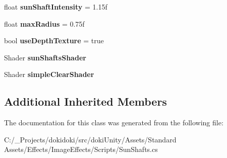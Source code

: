 \begin{DoxyCompactItemize}
\item 
float {\bfseries sun\+Shaft\+Intensity} = 1.\+15f\hypertarget{class_unity_standard_assets_1_1_image_effects_1_1_sun_shafts_a7a45b2ff55145c73dbe893aeabff41ad}{}\label{class_unity_standard_assets_1_1_image_effects_1_1_sun_shafts_a7a45b2ff55145c73dbe893aeabff41ad}

\item 
float {\bfseries max\+Radius} = 0.\+75f\hypertarget{class_unity_standard_assets_1_1_image_effects_1_1_sun_shafts_a2cccffc6bddcdc2fd32fbb6145bd408d}{}\label{class_unity_standard_assets_1_1_image_effects_1_1_sun_shafts_a2cccffc6bddcdc2fd32fbb6145bd408d}

\item 
bool {\bfseries use\+Depth\+Texture} = true\hypertarget{class_unity_standard_assets_1_1_image_effects_1_1_sun_shafts_ae9f2012110c36d04ac603df5317feb17}{}\label{class_unity_standard_assets_1_1_image_effects_1_1_sun_shafts_ae9f2012110c36d04ac603df5317feb17}

\item 
Shader {\bfseries sun\+Shafts\+Shader}\hypertarget{class_unity_standard_assets_1_1_image_effects_1_1_sun_shafts_a8e3768e277bb57d624799c8bd25b90e5}{}\label{class_unity_standard_assets_1_1_image_effects_1_1_sun_shafts_a8e3768e277bb57d624799c8bd25b90e5}

\item 
Shader {\bfseries simple\+Clear\+Shader}\hypertarget{class_unity_standard_assets_1_1_image_effects_1_1_sun_shafts_a13cbc36500a9914640a900bd8c3936c9}{}\label{class_unity_standard_assets_1_1_image_effects_1_1_sun_shafts_a13cbc36500a9914640a900bd8c3936c9}

\end{DoxyCompactItemize}
\subsection*{Additional Inherited Members}


The documentation for this class was generated from the following file\+:\begin{DoxyCompactItemize}
\item 
C\+:/\+\_\+\+Projects/dokidoki/src/doki\+Unity/\+Assets/\+Standard Assets/\+Effects/\+Image\+Effects/\+Scripts/Sun\+Shafts.\+cs\end{DoxyCompactItemize}
